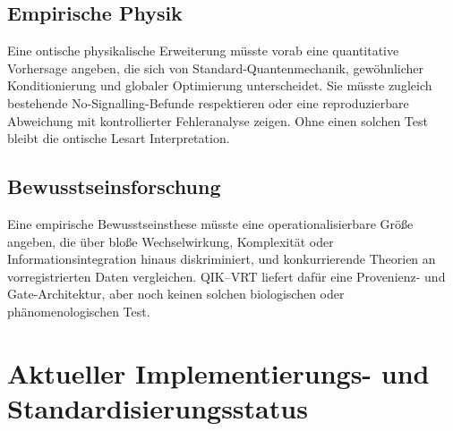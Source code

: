 \documentclass[11pt,a4paper]{article}
\theoremstyle{remark}
\begin{document}
\subsection{Empirische Physik}

Eine ontische physikalische Erweiterung müsste vorab eine quantitative
Vorhersage angeben, die sich von Standard-Quantenmechanik, gewöhnlicher
Konditionierung und globaler Optimierung unterscheidet. Sie müsste zugleich
bestehende No-Signalling-Befunde respektieren oder eine reproduzierbare
Abweichung mit kontrollierter Fehleranalyse zeigen. Ohne einen solchen Test
bleibt die ontische Lesart Interpretation.

\subsection{Bewusstseinsforschung}

Eine empirische Bewusstseinsthese müsste eine operationalisierbare Größe
angeben, die über bloße Wechselwirkung, Komplexität oder
Informationsintegration hinaus diskriminiert, und konkurrierende Theorien an
vorregistrierten Daten vergleichen. QIK--VRT liefert dafür eine
Provenienz- und Gate-Architektur, aber noch keinen solchen biologischen oder
phänomenologischen Test.

\section{Aktueller Implementierungs- und Standardisierungsstatus}
\end{document}
